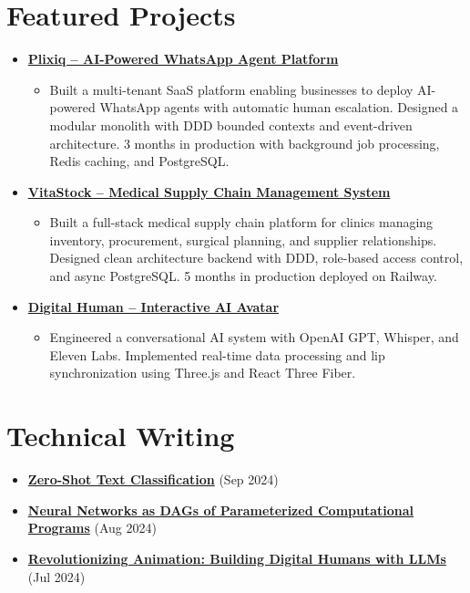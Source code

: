 \documentclass[letterpaper,11pt]{article}
\newcommand{\normalfaExternalLink}{{\mdseries\faExternalLink}}
\begin{document}
\section{Featured Projects}
\begin{itemize}[leftmargin=*, itemsep=1pt]
    \item \textbf{\href{https://github.com/asanchezyali/plixiq}{Plixiq -- AI-Powered WhatsApp Agent Platform \normalfaExternalLink}}
    \begin{itemize}[itemsep=0pt]
        \item Built a multi-tenant SaaS platform enabling businesses to deploy AI-powered WhatsApp agents with automatic human escalation. Designed a modular monolith with DDD bounded contexts and event-driven architecture. 3 months in production with background job processing, Redis caching, and PostgreSQL.
    \end{itemize}
    \item \textbf{\href{https://github.com/Pi-Agents/vitastock}{VitaStock -- Medical Supply Chain Management System \normalfaExternalLink}}
    \begin{itemize}[itemsep=0pt]
        \item Built a full-stack medical supply chain platform for clinics managing inventory, procurement, surgical planning, and supplier relationships. Designed clean architecture backend with DDD, role-based access control, and async PostgreSQL. 5 months in production deployed on Railway.
    \end{itemize}
    \item \textbf{\href{https://github.com/asanchezyali/talking-avatar-with-ai}{Digital Human -- Interactive AI Avatar \normalfaExternalLink}}
    \begin{itemize}[itemsep=0pt]
        \item Engineered a conversational AI system with OpenAI GPT, Whisper, and Eleven Labs. Implemented real-time data processing and lip synchronization using Three.js and React Three Fiber.
    \end{itemize}
\end{itemize}

\section{Technical Writing}
\begin{itemize}[leftmargin=*, itemsep=0pt]
    \item \textbf{\href{https://www.asanchezyali.com/blog/en/ai/20240917ZeroShot}{Zero-Shot Text Classification}} (Sep 2024)
    \item \textbf{\href{https://www.asanchezyali.com/blog/en/differentiable-programming/20240923DifferentiablePrograms}{Neural Networks as DAGs of Parameterized Computational Programs}} (Aug 2024)
    \item \textbf{\href{https://www.asanchezyali.com/blog/ai-avatars/20240703DigitalHuman}{Revolutionizing Animation: Building Digital Humans with LLMs}} (Jul 2024)
\end{itemize}
\end{document}
